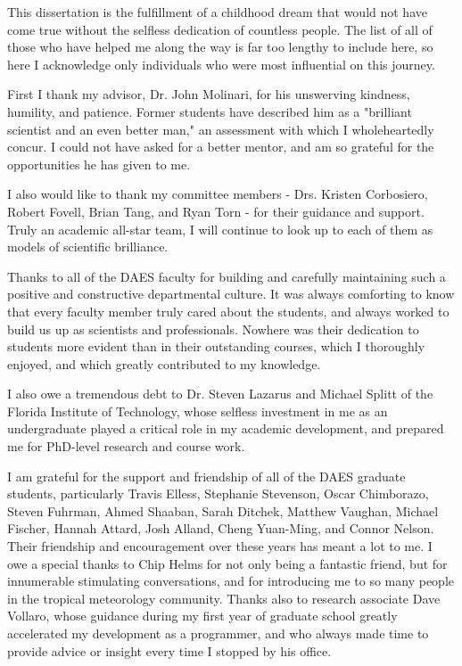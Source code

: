  


\indent \indent This dissertation is the fulfillment of a childhood dream that would not have come true without the selfless dedication of countless people.
The list of all of those who have helped me along the way is far too lengthy to include here, so here I acknowledge only individuals who were most influential on this journey.

First I thank my advisor, Dr. John Molinari, for his unswerving kindness, humility, and patience.  
Former students have described him as a "brilliant scientist and an even better man," an assessment with which I wholeheartedly concur.  
I could not have asked for a better mentor, and am so grateful for the opportunities he has given to me.

I also would like to thank my committee members - Drs. Kristen Corbosiero, Robert Fovell, Brian Tang, and Ryan Torn - for their guidance and support.  
Truly an academic all-star team, I will continue to look up to each of them as models of scientific brilliance.

Thanks to all of the DAES faculty for building and carefully maintaining such a positive and constructive departmental culture.  
It was always comforting to know that every faculty member truly cared about the students, and always worked to build us up as scientists and professionals.  
Nowhere was their dedication to students more evident than in their outstanding courses, which I thoroughly enjoyed, and which greatly contributed to my knowledge.  

I also owe a tremendous debt to Dr. Steven Lazarus and Michael Splitt of the Florida Institute of Technology, whose selfless investment in me as an undergraduate played a critical role in my academic development, and prepared me for PhD-level research and course work.

I am grateful for the support and friendship of all of the DAES graduate students, particularly Travis Elless, Stephanie Stevenson, Oscar Chimborazo, Steven Fuhrman, Ahmed Shaaban, Sarah Ditchek, Matthew Vaughan, Michael Fischer, Hannah Attard, Josh Alland, Cheng Yuan-Ming, and Connor Nelson.  
Their friendship and encouragement over these years has meant a lot to me.
I owe a special thanks to Chip Helms for not only being a fantastic friend, but for innumerable stimulating conversations, and for introducing me to so many people in the tropical meteorology community.  
Thanks also to research associate Dave Vollaro, whose guidance during my first year of graduate school greatly accelerated my development as a programmer, and who always made time to provide advice or insight every time I stopped by his office.

